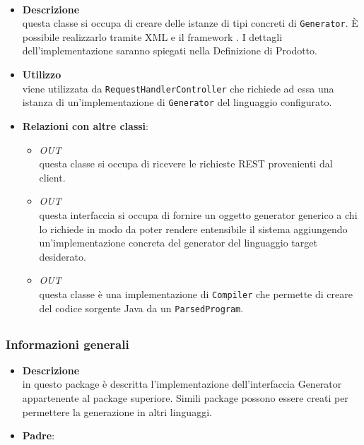 \paragraph{}
\label{\nogloxy{SWEDesigner::Server::Generator::GeneratorAssembler}}
\begin{itemize}
\item \textbf{Descrizione}\\
questa classe si occupa di creare delle istanze di tipi concreti di \texttt{Generator}. È possibile realizzarlo tramite XML e il framework \spring. I dettagli dell'implementazione saranno spiegati nella Definizione di Prodotto. %
\item \textbf{Utilizzo}\\
viene utilizzata da \texttt{RequestHandlerController} che richiede ad essa una istanza di un'implementazione di \texttt{Generator} del linguaggio configurato.
\item \textbf{Relazioni con altre classi}:
\begin{itemize}
\item \textit{OUT} \hyperref[\nogloxy{SWEDesigner::Server::Controller::RequestHandlerController}]{}\\
questa classe si occupa di ricevere le richieste REST provenienti dal client.
\item \textit{OUT} \hyperref[\nogloxy{SWEDesigner::Server::Generator::Generator}]{}\\
questa interfaccia si occupa di fornire un oggetto generator generico a chi lo richiede in modo da poter rendere entensibile il sistema aggiungendo un'implementazione concreta del generator del linguaggio target desiderato.
\item \textit{OUT} \hyperref[\nogloxy{SWEDesigner::Server::Generator::Java::JavaGenerator}]{}\\
questa classe è una implementazione di \texttt{Compiler} che permette di creare del codice sorgente Java da un \texttt{ParsedProgram}.
\end{itemize}
\end{itemize}
\subsection{}
\label{\nogloxy{SWEDesigner::Server::Generator::Java}}
\subsubsection{Informazioni generali}
\begin{itemize}
\item \textbf{Descrizione}\\
in questo package è descritta l'implementazione dell'interfaccia Generator appartenente al package superiore. Simili package possono essere creati per permettere la generazione in altri linguaggi.
\item \textbf{Padre}: \hyperref[\nogloxy{SWEDesigner::Server::Generator}]{}
\end{itemize}
